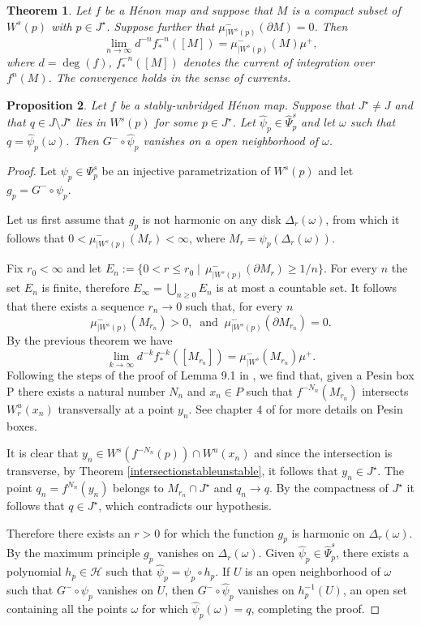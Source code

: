 \documentclass[10pt,a4paper]{article}
\newtheorem{theorem}{Theorem}[section]
\newtheorem{proposition}[theorem]{Proposition}
\begin{document}
\begin{theorem}
Let $f$ be a H\'enon map and suppose that $M$ is a compact subset of $W^s(p)$ with $p\in J^\star$. Suppose further that $\mu^-_{|W^s(p)}(\partial M)=0$. Then
\[
\lim_{n\to\infty}d^{-n}f^{-n}_*([M])=\mu^-_{|W^s(p)}(M)\mu^+,
\]
where $d=\deg(f)$, $f^{-n}_*([M])$ denotes the current of integration over $f^n(M)$. The convergence holds in the sense of currents.
\end{theorem}

\begin{proposition}
\label{vanishingprop}
Let $f$ be a stably-unbridged H\'enon map. Suppose that $J^\star\neq J$ and that $q\in J\setminus J^\star$ lies in $W^s(p)$ for some $p\in J^\star$. Let $\widehat\psi_p\in\widehat\Psi_p^s$ and let $\omega$ such that $q=\widehat\psi_p(\omega)$. Then $G^-\circ\widehat\psi_p$ vanishes on a open neighborhood of $\omega$.
\end{proposition}
\begin{proof}
Let $\psi_p\in \Psi_p^s$ be an injective parametrization of $W^s(p)$ and let $g_p=G^-\circ\psi_p$.

Let us first assume that $g_p$ is not harmonic on any disk $\Delta_r(\omega)$, from which it follows that $0<\mu^-_{|W^s(p)}(M_r)<\infty$, where $M_r=\psi_p(\Delta_r(\omega))$.

Fix $r_0<\infty$ and let $E_n:=\{0<r\leq r_0 \mid \,\mu^-_{|W^s(p)}(\partial M_r)\geq 1/n\}$. For every $n$ the set $E_n$ is finite, therefore $E_\infty=\bigcup_{n\geq 0}E_n$ is at most a countable set. It follows that there exists a sequence $r_n\to 0$ such that, for every $n$
\[
\mu^-_{|W^s(p)}(M_{r_n})>0, \; \; \mathrm{and} \; \; \mu^-_{|W^s(p)}(\partial M_{r_n})=0.
\]
By the previous theorem we have
\[
\lim_{k\to\infty}d^{-k}f^{-k}_*([M_{r_n}])=\mu^-_{|W^s}(M_{r_n})\mu^+.
\]
Following the steps of the proof of Lemma 9.1 in \cite{BLS}, we find that, given a Pesin box P  there exists a natural number $N_n$ and $x_n\in P$ such that $f^{-N_n}(M_{r_n})$ intersects $W^u_r(x_n)$ transversally at a point $y_n$. See chapter 4 of \cite{BLS} for more details on Pesin boxes.

It is clear that $y_n\in W^s(f^{-N_n}(p))\cap W^u(x_n)$ and since the intersection is transverse, by Theorem \ref{intersectionstableunstable}, it follows that $y_n\in J^\star$.
The point $q_n=f^{N_n}(y_n)$ belongs to $M_{r_n}\cap J^\star$ and $q_n\to q$. By the compactness of $J^\star$ it follows that $q\in J^\star$, which contradicts our hypothesis.

Therefore there exists an $r>0$ for which the function $g_p$ is harmonic on $\Delta_r(\omega)$. By the maximum principle $g_p$ vanishes on $\Delta_r(\omega)$. Given $\widehat\psi_p\in\widehat \Psi_p^s$, there exists a polynomial $h_p\in\mathcal H$ such that $\widehat\psi_p=\psi_p\circ h_p$. If $U$ is an open neighborhood of $\omega$ such that $G^-\circ\psi_p$ vanishes on $U$, then $G^-\circ\widehat\psi_p$ vanishes on $h_p^{-1}(U)$, an open set containing all the points $\omega$ for which $\widehat\psi_p(\omega)=q$, completing the proof.
\end{proof}
\end{document}
